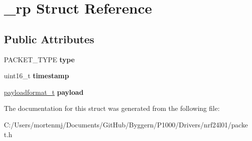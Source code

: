 \hypertarget{struct__rp}{\section{\-\_\-rp Struct Reference}
\label{struct__rp}
}
\subsection*{Public Attributes}
\begin{DoxyCompactItemize}
\item 
\hypertarget{struct__rp_ad05b10f44627878c1d5ffa3ac3aea973}{P\-A\-C\-K\-E\-T\-\_\-\-T\-Y\-P\-E {\bfseries type}}\label{struct__rp_ad05b10f44627878c1d5ffa3ac3aea973}

\item 
\hypertarget{struct__rp_a1e8e778166b5da2b4d91832c494d1bf8}{uint16\-\_\-t {\bfseries timestamp}}\label{struct__rp_a1e8e778166b5da2b4d91832c494d1bf8}

\item 
\hypertarget{struct__rp_a8df0eef8b32918b04fd57e68c9399d89}{\hyperlink{union__pf}{payloadformat\-\_\-t} {\bfseries payload}}\label{struct__rp_a8df0eef8b32918b04fd57e68c9399d89}

\end{DoxyCompactItemize}


The documentation for this struct was generated from the following file\-:\begin{DoxyCompactItemize}
\item 
C\-:/\-Users/mortenmj/\-Documents/\-Git\-Hub/\-Byggern/\-P1000/\-Drivers/nrf24l01/packet.\-h\end{DoxyCompactItemize}
